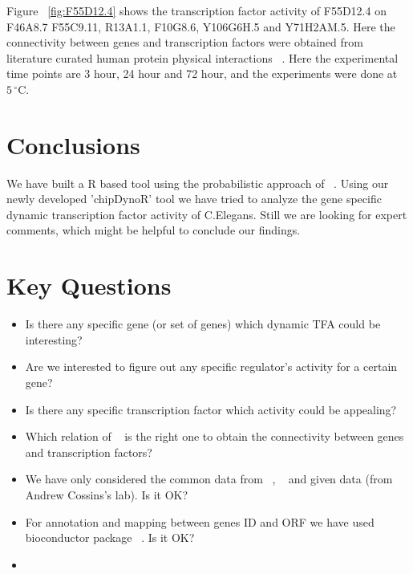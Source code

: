 \documentclass[12pt]{article}
\begin{document}
      
Figure ~\ref{fig:F55D12.4} shows the transcription factor activity of F55D12.4 on F46A8.7
F55C9.11, R13A1.1, F10G8.6, Y106G6H.5 and Y71H2AM.5. Here the connectivity between genes
and transcription factors were obtained from literature curated human protein 
physical interactions ~\cite{wormnet:url}. Here the experimental time points are 
3 hour, 24 hour and 72 hour, and the experiments were done at $5\,^{\circ}\mathrm{C}$.


\section{Conclusions}\label{conclusions}

We have built a R based tool using the probabilistic approach of ~\cite{sanguinetti:01}. Using our  
newly developed 'chipDynoR' tool we have tried to analyze the gene specific dynamic transcription 
factor activity of C.Elegans. Still we are looking for expert comments, which might be helpful
to conclude our findings.

\section{Key Questions}\label{keyQuestions}

\begin{itemize}
	\item Is there any specific gene (or set of genes) which dynamic TFA could be interesting?
	\item Are we interested to figure out any specific regulator's activity for a certain gene?
	\item Is there any specific transcription factor which activity could be appealing?
	\item Which relation of ~\cite{wormnet:url} is the right one to obtain the connectivity
	      between genes and transcription factors?
	\item We have only considered the common data from ~\cite{wormnet:url}, ~\cite{edgedb:01} 
	      and given data (from Andrew Cossins's lab). Is it OK? 
	\item For annotation and mapping between genes ID and ORF we have used bioconductor 
	      package ~\cite{celegans:db}.
	      Is it OK?
	\item 
\end{itemize}	      


%
%



\end{document}
